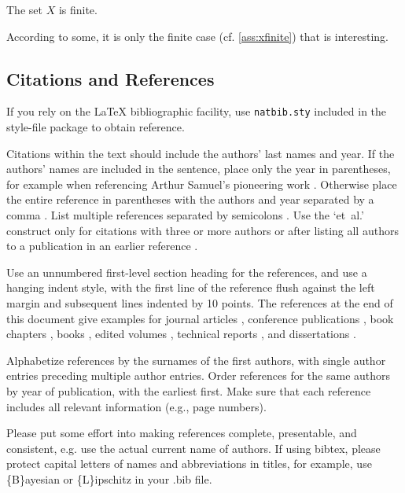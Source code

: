         \begin{assumption}
            The set $X$ is finite.
            \label{ass:xfinite}
        \end{assumption}

        \begin{remark}
            According to some, it is only the finite case (cf. \cref{ass:xfinite}) that is 
            interesting.
        \end{remark}


    \subsection{Citations and References}

    If you rely on the \LaTeX{} bibliographic
    facility, use \texttt{natbib.sty}
    included in the style-file package to obtain reference.

    Citations within the text should include the authors' last names and
    year. If the authors' names are included in the sentence, place only
    the year in parentheses, for example when referencing Arthur Samuel's
    pioneering work . Otherwise place the entire
    reference in parentheses with the authors and year separated by a
    comma \cite{Samuel59}. List multiple references separated by
    semicolons \cite{kearns89,Samuel59,mitchell80}. Use the `et~al.'
    construct only for citations with three or more authors or after
    listing all authors to a publication in an earlier reference \cite{MachineLearningI}.

    Use an unnumbered first-level section heading for the references, and use a
    hanging indent style, with the first line of the reference flush against the
    left margin and subsequent lines indented by 10 points. The references at the
    end of this document give examples for journal articles \cite{Samuel59},
    conference publications \cite{langley00}, book chapters \cite{Newell81}, books
    \cite{DudaHart2nd}, edited volumes \cite{MachineLearningI}, technical reports
    \cite{mitchell80}, and dissertations \cite{kearns89}.

    Alphabetize references by the surnames of the first authors, with
    single author entries preceding multiple author entries. Order
    references for the same authors by year of publication, with the
    earliest first. Make sure that each reference includes all relevant
    information (e.g., page numbers).

    Please put some effort into making references complete, presentable, and
    consistent, e.g. use the actual current name of authors.
    If using bibtex, please protect capital letters of names and
    abbreviations in titles, for example, use \{B\}ayesian or \{L\}ipschitz
    in your .bib file.